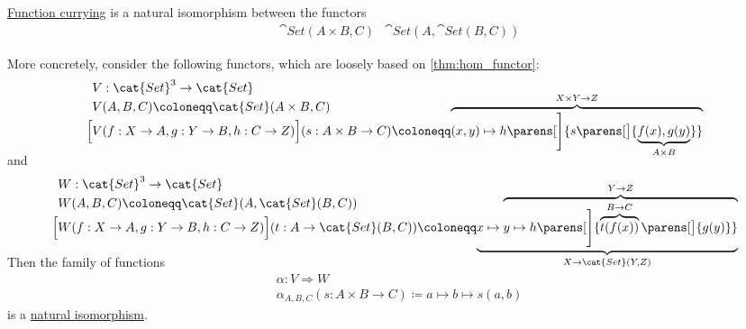 \begin{proposition}\label{thm:currying_is_natural_isomorphism}
  \hyperref[def:function_currying]{Function currying} is a natural isomorphism between the functors
  \begin{align*}
    &\cat{Set}(A \times B, C)
    &\cat{Set}(A, \cat{Set}(B, C))
  \end{align*}

  More concretely, consider the following functors, which are loosely based on \cref{thm:hom_functor}:
  \begin{equation*}
    \begin{aligned}
      &V: \cat{Set}^3 \to \cat{Set} \\
      &V(A, B, C) \coloneqq \cat{Set}(A \times B, C) \\
      \Big[& V(f: X \to A, g: Y \to B, h: C \to Z) \Big](s: A \times B \to C) \coloneqq \smash{ \overbrace{ (x, y) \mapsto h\parens[\Bigg]{ s\parens[\big]{ \underbrace{ f(x), g(y) }_{A \times B} } } }^{X \times Y \to Z} } \\
    \end{aligned}
  \end{equation*}
  and
  \begin{equation*}
    \begin{aligned}
      &W: \cat{Set}^3 \to \cat{Set} \\
      &W(A, B, C) \coloneqq \cat{Set}(A, \cat{Set}(B, C)) \\
      \Big[& W(f: X \to A, g: Y \to B, h: C \to Z) \Big](t: A \to \cat{Set}(B, C)) \coloneqq \smash{ \underbrace{ x \mapsto \overbrace{y \mapsto h\parens[\Bigg]{ \overbrace{t(f(x))}^{B \to C}\parens[\big]{ g(y) } } }^{Y \to Z} }_{X \to \cat{Set}(Y, Z)} } \\
    \end{aligned}
  \end{equation*}

  Then the family of functions
  \begin{equation*}
    \begin{aligned}
      &\alpha: V \Rightarrow W \\
      &\alpha_{A,B,C}(s: A \times B \to C) \coloneqq a \mapsto b \mapsto s(a, b)
    \end{aligned}
  \end{equation*}
  is a \hyperref[thm:natural_isomorphism]{natural isomorphism}.
\end{proposition}
